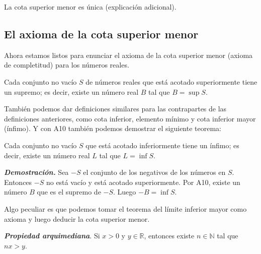 \documentclass{report}
\begin{document}
    La cota superior menor es única (explicación adicional).
    
    \subsection*{El axioma de la cota superior menor}
    
    Ahora estamos listos para enunciar el axioma de la cota superior menor (axioma de completitud) para los números reales.
    
    \begin{axBox}
        Cada conjunto no vacío $S$ de números reales que está acotado superiormente tiene un supremo; es decir, existe un número real $B$ tal que $B = \sup S$.
    \end{axBox}
    
    También podemos dar definiciones similares para las contrapartes de las definiciones anteriores, como cota inferior, elemento mínimo y cota inferior mayor (ínfimo). Y con A10 también podemos demostrar el siguiente teorema:

    \begin{thBox}
        Cada conjunto no vacío $S$ que está acotado inferiormente tiene un ínfimo; es decir, existe un número real $L$ tal que $L = \inf S$.
    \end{thBox}
    \textit{\textbf{Demostración.}} Sea $-S$ el conjunto de los negativos de los números en $S$. Entonces $-S$ no está vacío y está acotado superiormente. Por A10, existe un número $B$ que es el supremo de $-S$. Luego $-B = \inf S$.

    Algo peculiar es que podemos tomar el teorema del límite inferior mayor como axioma y luego deducir la cota superior menor.

    \begin{thBox}
        \textit{\textbf{Propiedad arquimediana}}. Si $x > 0$ y $y \in \mathbb{R}$, entonces existe $n \in \mathbb{N}$ tal que $nx > y$.
    \end{thBox}
\end{document}
